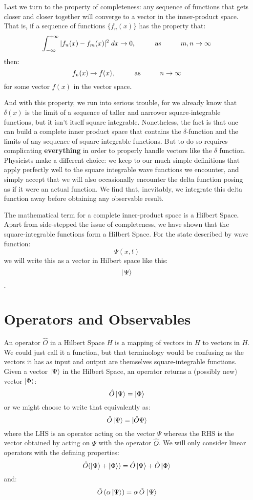 \documentclass[12pt]{book}
\begin{document}
Last we turn to the property of completeness:  any sequence of functions that gets closer and closer together will converge to a vector in the inner-product space.
That is, if a sequence of functions $\{f_n(x)\}$ has the property that:
$$\int_{-\infty}^{+\infty} |f_n(x) - f_m(x)|^2 \; dx \to 0, \hspace{1cm} {\rm as} \hspace{1cm} m,n \to \infty$$
then:
$$f_n(x) \to f(x), \hspace{1cm} {\rm as} \hspace{1cm} n \to \infty$$
for some vector $f(x)$ in the vector space.

And with this property, we run into serious trouble, for we already know that $\delta(x)$ is the limit of a sequence of taller and narrower square-integrable functions, but it isn't itself square integrable.  Nonetheless, the fact is that one can build a complete inner product space that contains the $\delta$-function and the limits of any sequence of square-integrable functions.  But to do so requires complicating {\bf everything} in order to properly handle vectors like the $\delta$ function.  Physicists make a different choice: we keep to our much simple definitions that apply perfectly well to the square integrable wave functions we encounter, and simply accept that we will also occasionally encounter the delta function posing as if it were an actual function.  We find that, inevitably, we integrate this delta function away before obtaining any observable result.

The mathematical term for a complete inner-product space is a Hilbert Space.  Apart from side-stepped the issue of completeness, we have shown that the square-integrable functions form a Hilbert Space.  
For the state described by wave function:
$$\Psi(x,t)$$
we will write this as a vector in Hilbert space like this:
$$\ket{\Psi}$$.

\section{Operators and Observables}

An operator $\hat{O}$ in a Hilbert Space $H$ is a mapping of vectors in $H$ to vectors in $H$.  We could just call it a function, but that terminology would be confusing as the vectors it has as input and output are themselves square-integrable functions.  Given a vector $\ket{\Psi}$ in the Hilbert Space, an operator returns a (possibly new) vector $\ket{\Phi}$:
$$\hat{O}\ket{\Psi} = \ket{\Phi}$$ 
or we might choose to write that equivalently as:
$$\hat{O}\ket{\Psi} = \ket{\hat{O} \Psi}$$ 
where the LHS is an operator acting on the vector $\Psi$ whereas the RHS is the vector obtained by acting on $\Psi$ with the operator $\hat{O}$.  We will only consider linear operators with the defining properties:
$$\hat{O}(\ket{\Psi}+\ket{\Phi}) = \hat{O}\ket{\Psi}+\hat{O}\ket{\Phi}$$
and:
$$\hat{O}\,(\alpha\ket{\Psi}) = \alpha \,\hat{O}\,\ket{\Psi}$$
\end{document}

